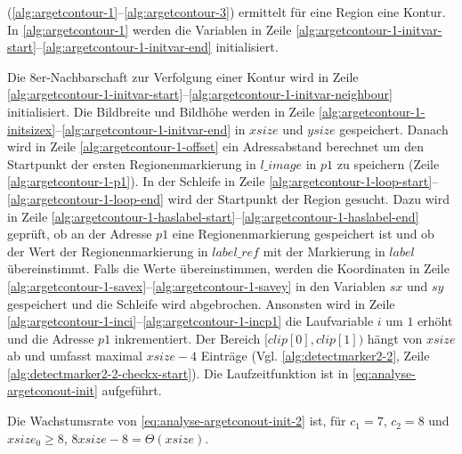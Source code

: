  (\autoref{alg:argetcontour-1}--\autoref{alg:argetcontour-3}) ermittelt für eine Region eine
 Kontur. In \autoref{alg:argetcontour-1} werden die Variablen in Zeile
 \ref{alg:argetcontour-1-initvar-start}--\ref{alg:argetcontour-1-initvar-end} initialisiert.

Die 8er-Nachbarschaft zur Verfolgung einer Kontur wird in Zeile
 \ref{alg:argetcontour-1-initvar-start}--\ref{alg:argetcontour-1-initvar-neighbour} initialisiert. Die Bildbreite und
 Bildhöhe werden in Zeile \ref{alg:argetcontour-1-initsizex}--\ref{alg:argetcontour-1-initvar-end} in $\mathit{xsize}$
 und $\mathit{ysize}$ gespeichert. Danach wird in Zeile \ref{alg:argetcontour-1-offset} ein Adressabstand berechnet um
 den Startpunkt der ersten Regionenmarkierung in $\mathit{l\_image}$ in $\mathit{p1}$ zu speichern (Zeile
 \ref{alg:argetcontour-1-p1}). In der Schleife in Zeile
 \ref{alg:argetcontour-1-loop-start}--\ref{alg:argetcontour-1-loop-end} wird der Startpunkt der Region gesucht. Dazu
 wird in Zeile \ref{alg:argetcontour-1-haslabel-start}--\ref{alg:argetcontour-1-haslabel-end} geprüft, ob an der
 Adresse $\mathit{p1}$ eine Regionenmarkierung gespeichert ist und ob der Wert der Regionenmarkierung in
 $\mathit{label\_ref}$ mit der Markierung in $\mathit{label}$ übereinstimmt. Falls die Werte übereinstimmen, werden die
 Koordinaten in Zeile \ref{alg:argetcontour-1-savex}--\ref{alg:argetcontour-1-savey} in den Variablen $\mathit{sx}$ und
 $\mathit{sy}$ gespeichert und die Schleife wird abgebrochen. Ansonsten wird in Zeile
 \ref{alg:argetcontour-1-inci}--\ref{alg:argetcontour-1-incp1} die Laufvariable $i$ um $1$ erhöht und die Adresse
 $\mathit{p1}$ inkrementiert. Der Bereich $[\mathit{clip}[0],\mathit{clip}[1])$ hängt von $\mathit{xsize}$ ab und
 umfasst maximal $\mathit{xsize} - 4$ Einträge (Vgl. \autoref{alg:detectmarker2-2}, Zeile
 \ref{alg:detectmarker2-2-checkx-start}). Die Laufzeitfunktion ist in \autoref{eq:analyse-argetconout-init} aufgeführt.

Die Wachstumsrate von \autoref{eq:analyse-argetconout-init-2} ist, für $c_{1} = 7$, $c_{2} = 8$ und $\mathit{xsize}_0
 \geq 8$, $8\mathit{xsize} - 8 = \Theta(\mathit{xsize})$.

